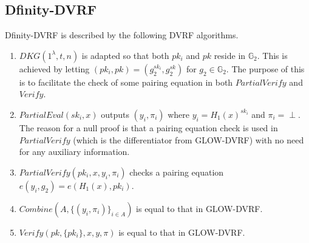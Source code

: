 \documentclass[letterpaper,twocolumn,10pt]{article}
\theoremstyle{definition}
\theoremstyle{remark}
\begin{document}
\subsection{Dfinity-DVRF}
\label{appendix:dfinity-dvrf}
Dfinity-DVRF is described by the following DVRF algorithms.
\begin{enumerate}
\item $DKG(1^\lambda, t, n)$ is adapted so that both $pk_i$ and $pk$ reside in $\mathbb{G}_2$. This is achieved by letting $(pk_i, pk) = (g_2^{sk_i}, g_2^{sk})$ for $g_2 \in \mathbb{G}_2$. The purpose of this is to facilitate the check of some pairing equation in both $PartialVerify$ and $Verify$.
\item $PartialEval(sk_i, x)$ outputs $(y_i, \pi_i)$ where $y_i = H_1(x)^{sk_i}$ and $\pi_i = \text{$\perp$}$. The reason for a null proof is that a pairing equation check is used in $PartialVerify$ (which is the differentiator from GLOW-DVRF) with no need for any auxiliary information.
\item $PartialVerify(pk_i, x, y_i, \pi_i)$ checks a pairing equation $e(y_i, g_2) = e(H_1(x), pk_i)$.
\item $Combine(A, \{(y_i, \pi_i)\}_{i \in A})$ is equal to that in GLOW-DVRF.
\item $Verify(pk, \{pk_i\}, x, y, \pi)$ is equal to that in GLOW-DVRF.
\end{enumerate}
\end{document}
